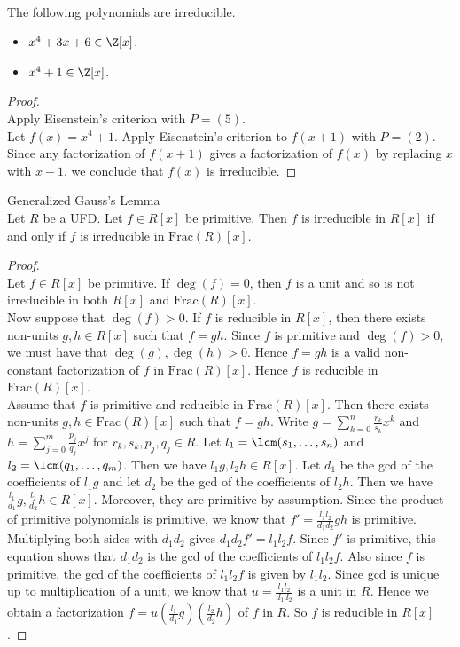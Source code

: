 \documentclass[a4paper]{article}
\begin{document}
\begin{eg}{}{}\\
The following polynomials are irreducible. 
\begin{itemize}
\item $x^4+3x+6\in\Z[x]$. 
\item $x^4+1\in\Z[x]$. 
\end{itemize}
\begin{proof}\\
Apply Eisenstein's criterion with $P=(5)$. \\

Let $f(x)=x^4+1$. Apply Eisenstein's criterion to $f(x+1)$ with $P=(2)$. Since any factorization of $f(x+1)$ gives a factorization of $f(x)$ by replacing $x$ with $x-1$, we conclude that $f(x)$ is irreducible. 
\end{proof}	
\end{eg}

\begin{thm}{Generalized Gauss's Lemma}{}\\
Let $R$ be a UFD. Let $f\in R[x]$ be primitive. Then $f$ is irreducible in $R[x]$ if and only if $f$ is irreducible in $\text{Frac}(R)[x]$. 
\begin{proof}\\
Let $f\in R[x]$ be primitive. If $\deg(f)=0$, then $f$ is a unit and so is not irreducible in both $R[x]$ and $\text{Frac}(R)[x]$. \\

Now suppose that $\deg(f)>0$. If $f$ is reducible in $R[x]$, then there exists non-units $g,h\in R[x]$ such that $f=gh$. Since $f$ is primitive and $\deg(f)>0$, we must have that $\deg(g),\deg(h)>0$. Hence $f=gh$ is a valid non-constant factorization of $f$ in $\text{Frac}(R)[x]$. Hence $f$ is reducible in $\text{Frac}(R)[x]$. \\

Assume that $f$ is primitive and reducible in $\text{Frac}(R)[x]$. Then there exists non-units $g,h\in\text{Frac}(R)[x]$ such that $f=gh$. Write $g=\sum_{k=0}^n\frac{r_k}{s_k}x^k$ and $h=\sum_{j=0}^m\frac{p_j}{q_j}x^j$ for $r_k,s_k,p_j,q_j\in R$. Let $l_1=\lcm(s_1,\dots,s_n)$ and $l_2=\lcm(q_1,\dots,q_m)$. Then we have $l_1g,l_2h\in R[x]$. Let $d_1$ be the gcd of the coefficients of $l_1g$ and let $d_2$ be the gcd of the coefficients of $l_2h$. Then we have $\frac{l_1}{d_1}g,\frac{l_2}{d_2}h\in R[x]$. Moreover, they are primitive by assumption. Since the product of primitive polynomials is primitive, we know that $f'=\frac{l_1l_2}{d_1d_2}gh$ is primitive. Multiplying both sides with $d_1d_2$ gives $d_1d_2f'=l_1l_2f$. Since $f'$ is primitive, this equation shows that $d_1d_2$ is the gcd of the coefficients of $l_1l_2f$. Also since $f$ is primitive, the gcd of the coefficients of $l_1l_2f$ is given by $l_1l_2$. Since gcd is unique up to multiplication of a unit, we know that $u=\frac{l_1l_2}{d_1d_2}$ is a unit in $R$. Hence we obtain a factorization $f=u\left(\frac{l_1}{d_1}g\right)\left(\frac{l_2}{d_2}h\right)$ of $f$ in $R$. So $f$ is reducible in $R[x]$. 
\end{proof}
\end{thm}
\end{document}
